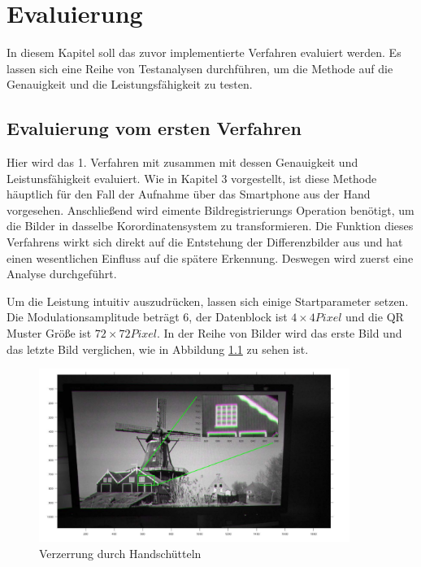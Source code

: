 \chapter{Evaluierung} \label{cha:Evaluierung}

In diesem Kapitel soll das zuvor implementierte Verfahren evaluiert werden. Es lassen sich eine Reihe von Testanalysen durchführen, um die Methode auf die Genauigkeit und die Leistungsfähigkeit zu testen.


\section{Evaluierung vom ersten Verfahren}

Hier wird das 1. Verfahren mit zusammen mit dessen Genauigkeit und Leistunsfähigkeit evaluiert. Wie in Kapitel 3 vorgestellt, ist diese Methode häuptlich für den Fall der Aufnahme über das Smartphone aus der Hand vorgesehen. Anschließend wird eimente Bildregistrierungs Operation benötigt, um die Bilder in dasselbe Korordinatensystem zu transformieren. Die Funktion dieses Verfahrens wirkt sich direkt auf die Entstehung der Differenzbilder aus und hat einen wesentlichen Einfluss auf die spätere Erkennung. Deswegen wird zuerst eine Analyse durchgeführt.

Um die Leistung intuitiv auszudrücken, lassen sich einige Startparameter setzen. Die Modulationsamplitude beträgt 6, der Datenblock ist $ 4 \times 4 Pixel$ und die QR Muster Größe ist $ 72 \times 72 Pixel $.  In der Reihe von Bilder wird das erste Bild und das letzte Bild verglichen, wie in Abbildung \ref{fig:vorregistration} zu sehen ist. 
\begin{figure}[H]
 \centering 
  \includegraphics[keepaspectratio,width=0.9\textwidth]{images/5_Implementirung/vorregistration.pdf}
 \caption{Verzerrung durch Handschütteln}
 \label{fig:vorregistration}
\end{figure}

